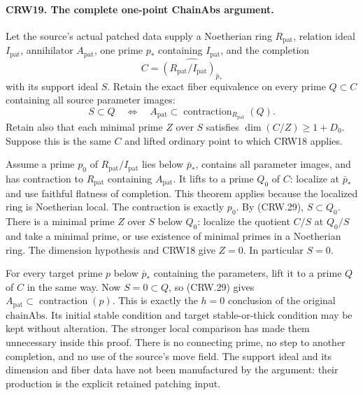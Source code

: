 \paragraph{CRW19. The complete one-point ChainAbs argument.}
\label{claim:CRW19}
Let the source's actual patched data supply a
Noetherian ring $R_{\mathrm{pat}}$, relation ideal
$I_{\mathrm{pat}}$, annihilator $A_{\mathrm{pat}}$,
one prime $p_*$ containing $I_{\mathrm{pat}}$,
and the completion
\[
 C=\widehat{(R_{\mathrm{pat}}/I_{\mathrm{pat}})_{\bar p_*}}
\]
with its support ideal $S$.
Retain the exact fiber equivalence on every prime
$Q\subset C$ containing all source parameter images:
\[
 S\subset Q\quad\Longleftrightarrow\quad
 A_{\mathrm{pat}}\subset
       \operatorname{contraction}_{R_{\mathrm{pat}}}(Q).
                                                               \tag{CRW.29}
\]
Retain also that each minimal prime $Z$ over $S$
satisfies $\dim(C/Z)\ge1+D_0$.
Suppose this is the same $C$ and lifted ordinary
point to which CRW18 applies.

Assume a prime $p_0$ of $R_{\mathrm{pat}}/I_{\mathrm{pat}}$
lies below $\bar p_*$, contains all parameter images,
and has contraction to $R_{\mathrm{pat}}$ containing
$A_{\mathrm{pat}}$.
It lifts to a prime $Q_0$ of $C$: localize at
$\bar p_*$ and use faithful flatness of completion.
This theorem applies because the localized ring is
Noetherian local.  The contraction is exactly $p_0$.
By (CRW.29), $S\subset Q_0$.
There is a minimal prime $Z$ over $S$ below $Q_0$:
localize the quotient $C/S$ at $Q_0/S$ and take a
minimal prime, or use existence of minimal primes
in a Noetherian ring.
The dimension hypothesis and CRW18 give $Z=0$.
In particular $S=0$.

For every target prime $p$ below $\bar p_*$ containing
the parameters, lift it to a prime $Q$ of $C$ in
the same way.  Now $S=0\subset Q$, so (CRW.29)
gives $A_{\mathrm{pat}}\subset\operatorname{contraction}(p)$.
This is exactly the $h=0$ conclusion of the original
$\mathrm{chainAbs}$.  Its initial stable condition
and target stable-or-thick condition may be kept
without alteration.  The stronger local comparison
has made them unnecessary inside this proof.
There is no connecting prime, no step to another
completion, and no use of the source's $\mathrm{move}$ field.
The support ideal and its dimension and fiber data
have not been manufactured by the argument: their
production is the explicit retained patching input.

